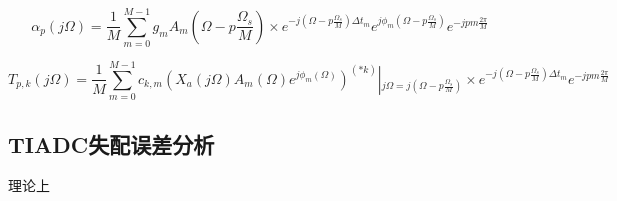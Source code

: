 		\begin{equation}
			{\alpha _p}\left( {j\Omega } \right) = \frac{1}{M}\sum\limits_{m = 0}^{M - 1} {{g_m}{A_m}\left( {\Omega  - p\frac{{{\Omega _s}}}{M}} \right) \times {e^{ - j\left( {\Omega  - p\frac{{{\Omega _s}}}{M}} \right)\Delta {t_m}}}{e^{j{\phi _m}\left( {\Omega  - p\frac{{{\Omega _s}}}{M}} \right)}}{e^{ - jpm\frac{{2\pi }}{M}}}} 
		\end{equation}
		
		\begin{equation}
			{T_{p,k}}\left( {j\Omega } \right) = \frac{1}{M}\sum\limits_{m = 0}^{M - 1} {{c_{k,m}}{{\left( {{X_a}\left( {j\Omega } \right){A_m}\left( \Omega  \right){e^{j{\phi _m}\left( \Omega  \right)}}} \right)}^{\left( {*k} \right)}}\left| {_{j\Omega  = j\left( {\Omega  - p\frac{{{\Omega _s}}}{M}} \right)}} \right. \times {e^{ - j\left( {\Omega  - p\frac{{{\Omega _s}}}{M}} \right)\Delta {t_m}}}{e^{ - jpm\frac{{2\pi }}{M}}}} 
		\end{equation}
		
	\subsection{TIADC失配误差分析}
		理论上
		
			
	
	
	